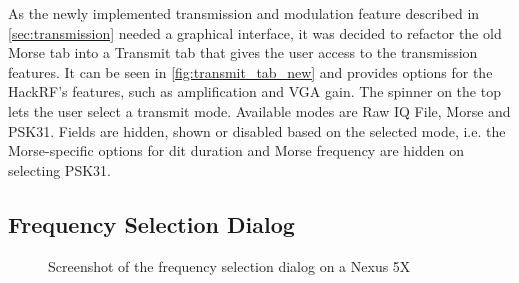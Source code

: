 As the newly implemented transmission and modulation feature described in \autoref{sec:transmission} needed a graphical interface, it was decided to refactor the old Morse tab into a Transmit tab that gives the user access to the transmission features. It can be seen in \autoref{fig:transmit_tab_new} and provides options for the HackRF's features, such as amplification and \ac{VGA} gain. The spinner on the top lets the user select a transmit mode. Available modes are Raw IQ File, Morse and \ac{PSK31}. Fields are hidden, shown or disabled based on the selected mode, i.e. the Morse-specific options for dit duration and Morse frequency are hidden on selecting \ac{PSK31}.


\subsection{Frequency Selection Dialog\label{sec:freq_dialog}}

\begin{figure}
\centering
{}
\hfill\null
{}
\caption{Screenshot of the frequency selection dialog on a Nexus 5X}
\label{fig:freq_dialog}
\end{figure}

